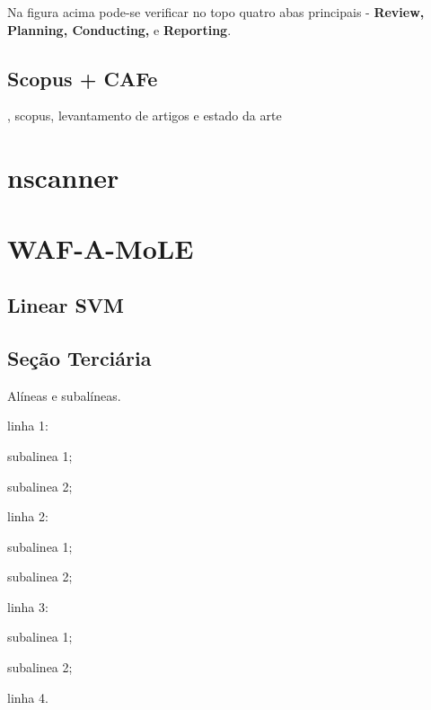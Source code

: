 Na figura acima pode-se verificar no topo quatro abas principais - \textbf{Review, Planning, Conducting, }e \textbf{Reporting}.


\subsection{Scopus + CAFe},
scopus, levantamento de artigos e estado da arte

\section{nscanner}

\section{WAF-A-MoLE}

\subsection{Linear SVM}

\subsection{Seção Terciária}

Alíneas e subalíneas.
\bigskip

\begin{alineas}
\item linha 1:
\begin{alineas}
\item subalinea 1;
\item subalinea 2;
\end{alineas}
\item linha 2:
\begin{subalineas}
\item subalinea 1;
\item subalinea 2;
\end{subalineas}
\item linha 3:
\begin{incisos}
\item subalinea 1;
\item subalinea 2;
\end{incisos}
\item linha 4.
\end{alineas}

